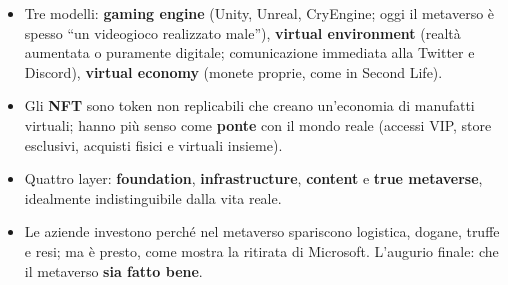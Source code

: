 \begin{itemize}
  \item Tre modelli: \textbf{gaming engine} (Unity, Unreal, CryEngine; oggi il
        metaverso è spesso ``un videogioco realizzato male''), \textbf{virtual
        environment} (realtà aumentata o puramente digitale; comunicazione
        immediata alla Twitter e Discord), \textbf{virtual economy} (monete
        proprie, come in Second Life).
  \item Gli \textbf{NFT} sono token non replicabili che creano un'economia di
        manufatti virtuali; hanno più senso come \textbf{ponte} con il mondo
        reale (accessi VIP, store esclusivi, acquisti fisici e virtuali insieme).
  \item Quattro layer: \textbf{foundation}, \textbf{infrastructure},
        \textbf{content} e \textbf{true metaverse}, idealmente indistinguibile
        dalla vita reale.
  \item Le aziende investono perché nel metaverso spariscono logistica, dogane,
        truffe e resi; ma è presto, come mostra la ritirata di Microsoft.
        L'augurio finale: che il metaverso \textbf{sia fatto bene}.
\end{itemize}
